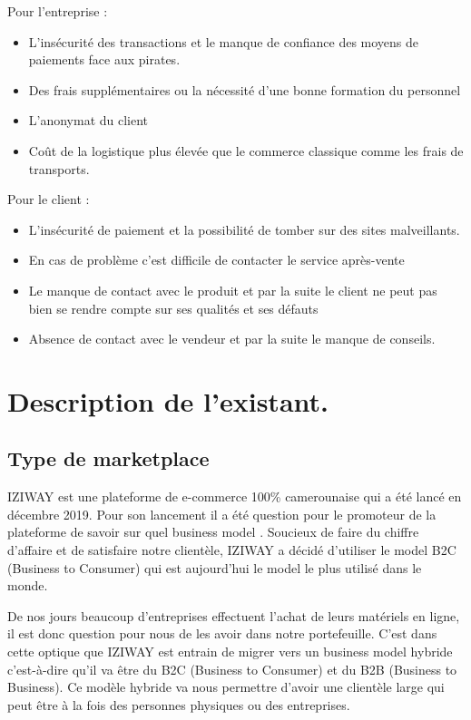 \begin{enumerate}
	Pour l'entreprise : 
\begin{itemize}[label=\textbullet, font=\LARGE \color{blue}]
	\item L’insécurité des transactions et le manque de confiance des moyens de paiements face aux pirates.
	\item Des frais supplémentaires ou la nécessité d’une bonne formation du personnel
	\item L’anonymat du client
	\item Coût de la logistique plus élevée que le commerce classique comme les frais de transports.
\end{itemize}
	Pour le client : 
\begin{itemize}[label=\textbullet, font=\LARGE \color{blue}]
	\item L’insécurité de paiement et la possibilité de tomber sur des sites malveillants.
	\item En cas de problème c’est difficile de contacter le service après-vente
	\item Le manque de contact avec le produit et par la suite le client ne peut pas bien se rendre compte sur ses qualités et ses défauts
	\item Absence de contact avec le vendeur et par la suite le manque de conseils.	
\end{itemize}
\end{enumerate}

\section{Description de l'existant.}

\subsection{Type de marketplace}

IZIWAY est une plateforme de e-commerce 100\% camerounaise qui a été lancé en décembre 2019. Pour son lancement il a été question pour le promoteur de la plateforme de savoir sur quel business model \cite{Ref6}. Soucieux de faire du chiffre d’affaire et de satisfaire notre clientèle, IZIWAY a décidé d’utiliser le model B2C (Business to Consumer) qui est aujourd’hui le model le plus utilisé dans le monde.

De nos jours beaucoup d’entreprises effectuent l’achat de leurs matériels en ligne, il est donc question pour nous de les avoir dans notre portefeuille. C’est dans cette optique que IZIWAY est entrain de migrer vers un business model hybride c’est-à-dire qu’il va être du B2C (Business to Consumer) et du B2B (Business to Business). Ce modèle hybride va nous permettre d’avoir une clientèle large qui peut être à la fois des personnes physiques ou des entreprises.

